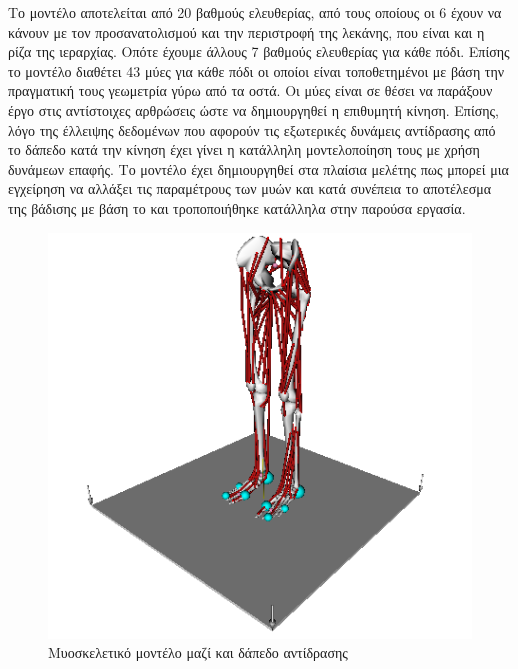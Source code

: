 Το μοντέλο αποτελείται από 20 βαθμούς ελευθερίας, από τους οποίους οι 6 έχουν να κάνουν με τον προσανατολισμού και την περιστροφή της λεκάνης, που είναι και η ρίζα της ιεραρχίας. Οπότε έχουμε άλλους 7 βαθμούς ελευθερίας για κάθε πόδι. Επίσης το μοντέλο διαθέτει 43 μύες για κάθε πόδι οι οποίοι είναι τοποθετημένοι με βάση την πραγματική τους γεωμετρία γύρω από τα οστά. Οι μύες είναι σε θέσει να παράξουν έργο στις αντίστοιχες αρθρώσεις ώστε να δημιουργηθεί η επιθυμητή κίνηση. Επίσης, λόγο της έλλειψης δεδομένων που αφορούν τις εξωτερικές δυνάμεις αντίδρασης από το δάπεδο κατά την κίνηση έχει γίνει η κατάλληλη μοντελοποίηση τους με χρήση δυνάμεων επαφής. Το μοντέλο έχει δημιουργηθεί στα πλαίσια μελέτης πως μπορεί μια εγχείρηση να αλλάξει τις παραμέτρους των μυών και κατά συνέπεια το αποτέλεσμα της βάδισης με βάση το \cite{delp90} και τροποποιήθηκε κατάλληλα στην παρούσα εργασία.

\begin{figure}[H]
    \centering
    \includegraphics[height=0.38\textheight]{fig/lower-limb-model.png}
    \caption{Μυοσκελετικό μοντέλο μαζί και δάπεδο αντίδρασης}
    \label{fig:lower-limb-model}
\end{figure}

